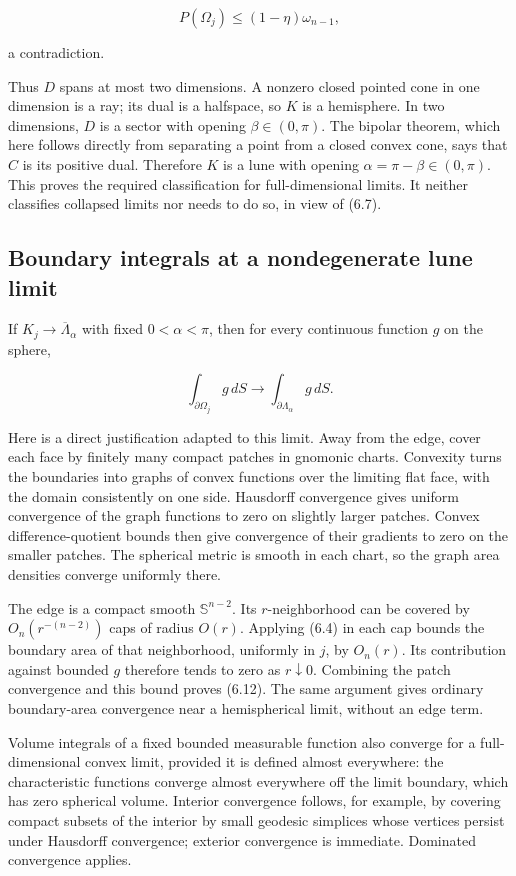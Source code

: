 \documentclass[11pt]{article}
\begin{document}
\[
P(\Omega_j)\leq(1-\eta)\omega_{n-1},
\tag{6.11}
\]

a contradiction.

Thus \(D\) spans at most two dimensions. A nonzero closed pointed cone
in one dimension is a ray; its dual is a halfspace, so \(K\) is a
hemisphere. In two dimensions, \(D\) is a sector with opening
\(\beta\in(0,\pi)\). The bipolar theorem, which here follows directly
from separating a point from a closed convex cone, says that \(C\) is
its positive dual. Therefore \(K\) is a lune with opening
\(\alpha=\pi-\beta\in(0,\pi)\). This proves the required classification
for full-dimensional limits. It neither classifies collapsed limits nor
needs to do so, in view of (6.7).

\subsection{Boundary integrals at a nondegenerate lune
limit}\label{boundary-integrals-at-a-nondegenerate-lune-limit}

If \(K_j\to\overline\Lambda_\alpha\) with fixed \(0<\alpha<\pi\), then
for every continuous function \(g\) on the sphere,

\[
\int_{\partial\Omega_j}g\,dS\longrightarrow
\int_{\partial\Lambda_\alpha}g\,dS.
\tag{6.12}
\]

Here is a direct justification adapted to this limit. Away from the
edge, cover each face by finitely many compact patches in gnomonic
charts. Convexity turns the boundaries into graphs of convex functions
over the limiting flat face, with the domain consistently on one side.
Hausdorff convergence gives uniform convergence of the graph functions
to zero on slightly larger patches. Convex difference-quotient bounds
then give convergence of their gradients to zero on the smaller patches.
The spherical metric is smooth in each chart, so the graph area
densities converge uniformly there.

The edge is a compact smooth \(\mathbb S^{n-2}\). Its \(r\)-neighborhood
can be covered by \(O_n(r^{-(n-2)})\) caps of radius \(O(r)\). Applying
(6.4) in each cap bounds the boundary area of that neighborhood,
uniformly in \(j\), by \(O_n(r)\). Its contribution against bounded
\(g\) therefore tends to zero as \(r\downarrow0\). Combining the patch
convergence and this bound proves (6.12). The same argument gives
ordinary boundary-area convergence near a hemispherical limit, without
an edge term.

Volume integrals of a fixed bounded measurable function also converge
for a full-dimensional convex limit, provided it is defined almost
everywhere: the characteristic functions converge almost everywhere off
the limit boundary, which has zero spherical volume. Interior
convergence follows, for example, by covering compact subsets of the
interior by small geodesic simplices whose vertices persist under
Hausdorff convergence; exterior convergence is immediate. Dominated
convergence applies.
\end{document}
